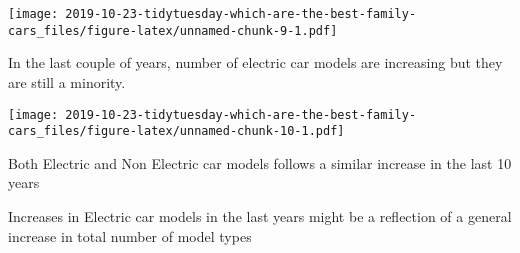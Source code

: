 \documentclass[]{article}
\newenvironment{Shaded}{\begin{snugshade}}{\end{snugshade}}
\newcommand{\CharTok}[1]{\textcolor[rgb]{0.31,0.60,0.02}{#1}}
\newcommand{\DataTypeTok}[1]{\textcolor[rgb]{0.13,0.29,0.53}{#1}}
\newcommand{\DecValTok}[1]{\textcolor[rgb]{0.00,0.00,0.81}{#1}}
\newcommand{\FloatTok}[1]{\textcolor[rgb]{0.00,0.00,0.81}{#1}}
\newcommand{\KeywordTok}[1]{\textcolor[rgb]{0.13,0.29,0.53}{\textbf{#1}}}
\newcommand{\NormalTok}[1]{#1}
\newcommand{\OperatorTok}[1]{\textcolor[rgb]{0.81,0.36,0.00}{\textbf{#1}}}
\newcommand{\StringTok}[1]{\textcolor[rgb]{0.31,0.60,0.02}{#1}}
\begin{document}
\texttt{[image: 2019-10-23-tidytuesday-which-are-the-best-family-cars\_files/figure-latex/unnamed-chunk-9-1.pdf]}

In the last couple of years, number of electric car models are
increasing but they are still a minority.

\begin{Shaded}
\end{Shaded}

\texttt{[image: 2019-10-23-tidytuesday-which-are-the-best-family-cars\_files/figure-latex/unnamed-chunk-10-1.pdf]}

Both Electric and Non Electric car models follows a similar increase in
the last 10 years

Increases in Electric car models in the last years might be a reflection
of a general increase in total number of model types
\end{document}
